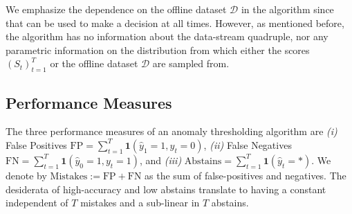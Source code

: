 We emphasize the dependence on the offline dataset $\mathcal{D}$ in the algorithm since that can be used to make a decision at all times. 
However, as mentioned before, the algorithm has no information about the data-stream quadruple, nor any parametric information on the distribution from which either the scores $(S_t)_{t=1}^T$ or the offline dataset $\mathcal{D}$ are sampled from. 


\subsection{Performance Measures}
\label{subsec:performance_defnition}

The three performance measures of an anomaly thresholding algorithm are {\em (i)} False Positives $\text{FP} = \sum_{t=1}^T \mathbf{1}(\hat{y}_1 = 1, y_t = 0)$, {\em (ii) } False Negatives $ \text{FN} = \sum_{t=1}^T \mathbf{1}(\hat{y}_0 = 1, y_t = 1)$, and {\em (iii)} $\text{Abstains} = \sum_{t=1}^T \mathbf{1}(\hat{y}_t = *)$. We
denote by $\text{Mistakes} := \text{FP} + \text{FN}$ as the sum of false-positives and negatives. The desiderata of high-accuracy and low abstains translate to having a constant independent of $T$ mistakes and a sub-linear in $T$ abstains. 